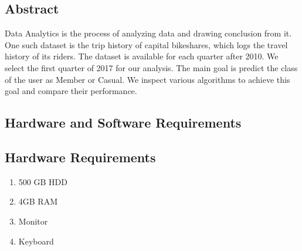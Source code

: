 \documentclass[a4paper, 12pt]{article}
\begin{document}
\newpage
\begin{center}
    \section{Abstract}
\end{center}
Data Analytics is the process of analyzing data and drawing conclusion from it. One such dataset is the trip history of capital bikeshares, which logs the travel history of its riders.
The dataset is available for each quarter after 2010. We select the first quarter of 2017 for our analysis. The main goal is predict the class of the user as Member or Casual. We inspect various algorithms to achieve this goal and compare their performance.

\newpage
\begin{center}
    \section{Hardware and Software Requirements}
\end{center}
\subsection{Hardware Requirements}
\begin{enumerate}
    \item 500 GB HDD
    \item 4GB RAM
    \item Monitor
    \item Keyboard
\end{enumerate}
\end{document}
